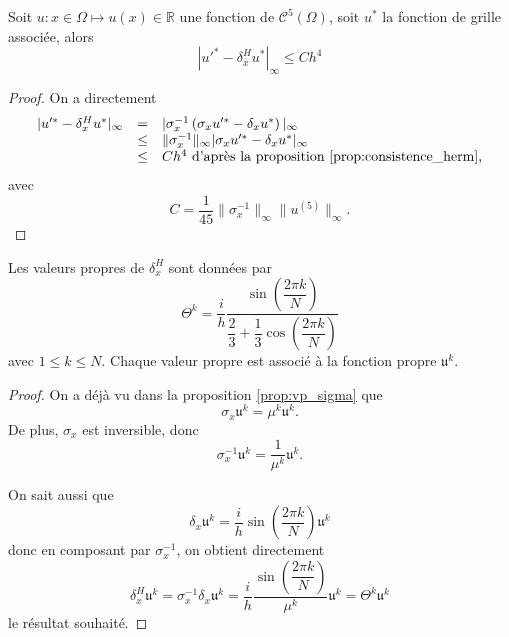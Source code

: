 \begin{theoreme}
Soit $u : x \in \Omega \mapsto u(x) \in \mathbb{R}$ une fonction de $\mathcal{C}^5 ( \Omega )$, soit $u^*$ la fonction de grille associée, alors
\begin{equation}
| u'^* -  \delta_x^H u^* |_{\infty} \leq C h^4
\end{equation}
\label{prop:consistence_herm2}
\end{theoreme}

\begin{proof}
On a directement 
\begin{equation*}
\begin{array}{rcl}
| u'^* -  \delta_x^H u^* |_{\infty} & = & | \sigma_x^{-1} \left( \sigma_x u'^* - \delta_x u^* \right) |_{\infty} \\
	& \leq & \| \sigma^{-1}_x \|_{\infty} |\sigma_x u'^* - \delta_x u^* |_{\infty}\\
	& \leq & C h^4 \text{ d'après la proposition \ref{prop:consistence_herm},}
\end{array}
\end{equation*}
avec
\begin{equation}
C = \dfrac{1}{45} \| \sigma^{-1}_x \|_{\infty} \| u^{(5)} \|_{\infty}.
\end{equation}
\end{proof}

\begin{proposition}
Les valeurs propres de $\delta_x^H$ sont données par 
\begin{equation}
\Theta^k = \dfrac{i}{h} \dfrac{\sin \left( \dfrac{2 \pi k}{N} \right)}{\dfrac{2}{3} + \dfrac{1}{3} \cos \left( \dfrac{2 \pi k}{N} \right)}
\end{equation}
avec $1 \leq k \leq N$. Chaque valeur propre est associé à la fonction propre $\mathfrak{u}^k$.
\label{prop:vp_herm}
\end{proposition}

\begin{proof}
On a déjà vu dans la proposition \ref{prop:vp_sigma} que 
\begin{equation}
\sigma_x \mathfrak{u}^k = \mu^k \mathfrak{u}^k.
\end{equation}
De plus, $\sigma_x$ est inversible, donc 
\begin{equation}
\sigma_x^{-1} \mathfrak{u}^k = \dfrac{1}{\mu^k} \mathfrak{u}^k.
\end{equation}

On sait aussi que 
\begin{equation}
\delta_x \mathfrak{u}^k = \dfrac{i}{h} \sin \left( \dfrac{2 \pi k}{N} \right) \mathfrak{u}^k
\end{equation}
donc en composant par $\sigma_x^{-1}$, on obtient directement 
\begin{equation}
\delta^H_x \mathfrak{u}^k = \sigma_x^{-1} \delta_x \mathfrak{u}^k = \dfrac{i}{h} \dfrac{\sin \left( \dfrac{2 \pi k}{N} \right)}{\mu^k} \mathfrak{u}^k = \Theta^k \mathfrak{u}^k
\end{equation}
le résultat souhaité.
\end{proof}

